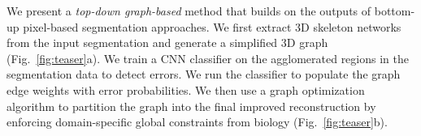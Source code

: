 %
%


We present a \textit{top-down graph-based} method that builds on the outputs of bottom-up pixel-based segmentation approaches. We first extract 3D skeleton networks from the input segmentation and generate a simplified 3D graph (Fig.~\ref{fig:teaser}a). We train a CNN classifier on the agglomerated regions in the segmentation data to detect errors. We run the classifier to populate the graph edge weights with error probabilities. We then use a graph optimization algorithm to partition the graph into the final improved reconstruction by enforcing domain-specific global constraints from biology (Fig.~\ref{fig:teaser}b).

